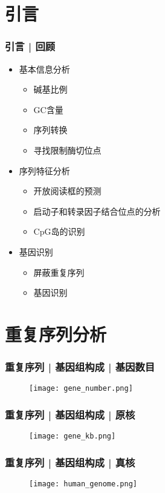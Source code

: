\section{引言}
\begin{frame}
  \frametitle{引言 | 回顾}
  \begin{itemize}[<+-|alert@+>]
    \item 基本信息分析
      \begin{itemize}
        \item 碱基比例
        \item GC含量
        \item 序列转换
        \item 寻找限制酶切位点
      \end{itemize}
    \item 序列特征分析
      \begin{itemize}
        \item 开放阅读框的预测
        \item 启动子和转录因子结合位点的分析
        \item CpG岛的识别
      \end{itemize}
    \item 基因识别
      \begin{itemize}
        \item 屏蔽重复序列
        \item 基因识别
      \end{itemize}
  \end{itemize}
\end{frame}

\section{重复序列分析}

\begin{frame}
  \frametitle{重复序列 | 基因组构成 | 基因数目}
  \begin{figure}
    \centering
    \texttt{[image: gene\_number.png]}
  \end{figure}
\end{frame}

\begin{frame}
  \frametitle{重复序列 | 基因组构成 | 原核}
  \begin{figure}
    \centering
    \texttt{[image: gene\_kb.png]}
  \end{figure}
\end{frame}

\begin{frame}
  \frametitle{重复序列 | 基因组构成 | 真核}
  \begin{figure}
    \centering
    \texttt{[image: human\_genome.png]}
  \end{figure}
\end{frame}

